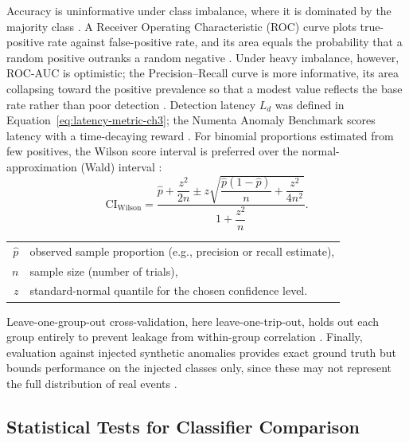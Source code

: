 \vspace{0.5em}

Accuracy is uninformative under class imbalance, where it is dominated by the majority class \cite{powers2020evaluation}. A Receiver Operating Characteristic (ROC) curve plots true-positive rate against false-positive rate, and its area equals the probability that a random positive outranks a random negative \cite{fawcett2006roc}. Under heavy imbalance, however, ROC-AUC is optimistic; the Precision--Recall curve is more informative, its area collapsing toward the positive prevalence so that a modest value reflects the base rate rather than poor detection \cite{davis2006prroc,saito2015prcurve}. Detection latency $L_d$ was defined in Equation~\ref{eq:latency-metric-ch3}; the Numenta Anomaly Benchmark scores latency with a time-decaying reward \cite{lavin2015nab}. For binomial proportions estimated from few positives, the Wilson score interval is preferred over the normal-approximation (Wald) interval \cite{wilson1927probable}:
%
\begin{equation}
\mathrm{CI}_{\mathrm{Wilson}} = \frac{\hat{p} + \dfrac{z^{2}}{2n} \pm z\sqrt{\dfrac{\hat{p}(1-\hat{p})}{n} + \dfrac{z^{2}}{4n^{2}}}}{1 + \dfrac{z^{2}}{n}}.
\label{eq:wilson-ch3}
\end{equation}
\begin{tabular}{@{}r@{~=~}l@{}}
$\hat{p}$ & observed sample proportion (e.g., precision or recall estimate), \\
$n$ & sample size (number of trials), \\
$z$ & standard-normal quantile for the chosen confidence level.
\end{tabular}

\vspace{0.5em}
Leave-one-group-out cross-validation, here leave-one-trip-out, holds out each group entirely to prevent leakage from within-group correlation \cite{arlot2010survey}. Finally, evaluation against injected synthetic anomalies provides exact ground truth but bounds performance on the injected classes only, since these may not represent the full distribution of real events \cite{chandola2009anomaly}.

\subsection{Statistical Tests for Classifier Comparison}
\label{sec:stats_tests_theory}

